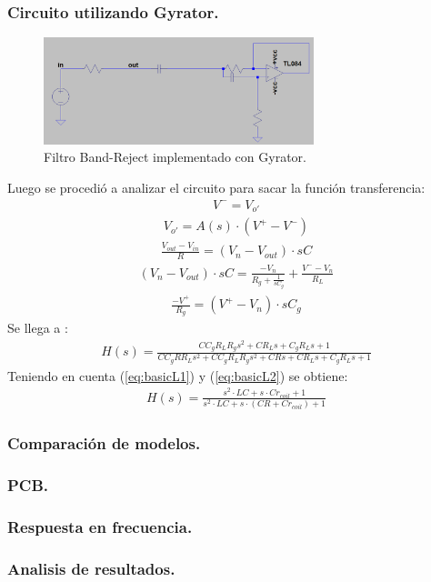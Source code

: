 \documentclass[a4paper]{article}
\begin{document}
\subsubsection{Circuito utilizando Gyrator.}
\begin{figure}[H]	
	\centering
	\includegraphics[width=0.7\textwidth]{gyrBR.PNG}
	\caption{Filtro Band-Reject implementado con Gyrator.}
	\label{fig:gyrBR}
\end{figure}
Luego se procedió a analizar el circuito para sacar la función transferencia:
\begin{align}V^- = V_{o'}\end{align}
\begin{align}V_{o'} = A(s)\cdot (V^+-V^-)\end{align}
\begin{align}\frac{V_{out}-V_{in}}{R}=(V_n-V_{out})\cdot sC\end{align}
\begin{align}(V_n-V_{out})\cdot sC = \frac{-V_n}{R_g+\frac{1}{sC_g}}+\frac{V^--V_n}{R_L}\end{align}
\begin{align}\frac{-V^+}{R_g}=(V^+-V_n)\cdot sC_g\end{align}
Se llega a :
\begin{align}  H(s)=\frac{C C_{g} R_{L} R_{g} s^{2} + C R_{L} s + C_{g} R_{L} s + 1}{C C_{g} R R_{L} s^{2} + C C_{g} R_{L} R_{g} s^{2} + C R s + C R_{L} s + C_{g} R_{L} s + 1} \end{align}
Teniendo en cuenta (\ref{eq:basicL1}) y (\ref{eq:basicL2}) se obtiene:
\begin{align}  H(s)=\frac{ s^{2}\cdot  LC + s \cdot  C r_{coil} + 1}{ s^{2}\cdot LC + s\cdot (C R+Cr_{coil}) + 1} 
\label{eq:BRG}
\end{align}
\subsubsection{Comparación de modelos.}
\subsubsection{PCB.}
\subsubsection{Respuesta en frecuencia.}
\subsubsection{Analisis de resultados.}
\end{document}
